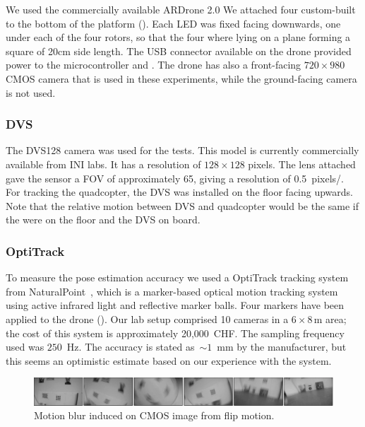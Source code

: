 We used the commercially available ARDrone 2.0 We attached four custom-built
\ALMs to the bottom of the platform ().
Each LED was fixed facing downwards, one under each of the four rotors,
so that the four where lying on a plane forming a square of 20cm side
length. The USB connector available on the drone provided power to
the microcontroller and \ALMs. The drone has also a front-facing
$720\times980$ CMOS camera that is used in these experiments, while
the ground-facing camera is not used.


\subsubsection{DVS}

The DVS128 camera was used for the tests. This model is currently
commercially available from INI labs. It has a resolution of $128\times128$
pixels. The lens attached gave the sensor a FOV of approximately 65\textdegree{},
giving a resolution of 0.5~pixels/\textdegree{}. For tracking the
quadcopter, the DVS was installed on the floor facing upwards. Note
that the relative motion between DVS and quadcopter would be the same
if the \ALMs were on the floor and the DVS on board.


\subsubsection{OptiTrack}

To measure the pose estimation accuracy we used a OptiTrack tracking
system from NaturalPoint~\cite{optitrack}, which is a marker-based
optical motion tracking system using active infrared light and reflective
marker balls. Four markers have been applied to the drone ().
Our lab setup comprised 10 cameras in a $6\times8\,\mbox{m}$ area;
the cost of this system is approximately 20,000~CHF. The sampling
frequency used was $250$~Hz. The accuracy is stated as~$\sim1$~mm
by the manufacturer, but this seems an optimistic estimate based on
our experience with the system.



\begin{figure}
\begin{centering}

\par\end{centering}

\begin{centering}
\includegraphics[width=17cm]{figures/slides/flip_sequence}
\par\end{centering}

\caption{\label{fig:Motion-blur-induced}Motion blur induced on CMOS image
from flip motion.}
\end{figure}



